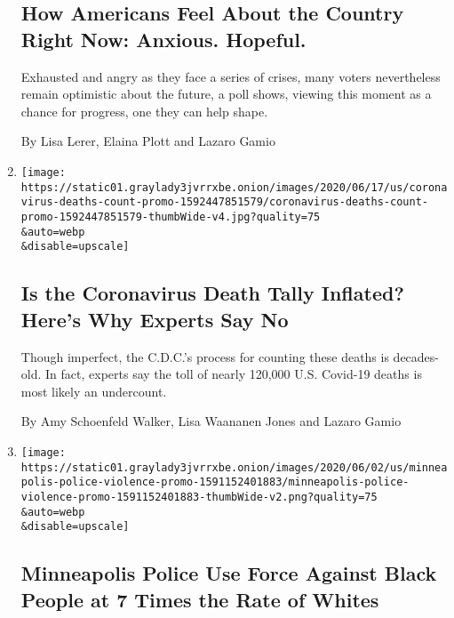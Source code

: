 \begin{enumerate}
{  \subsection{How Americans Feel About the Country Right Now: Anxious.
  Hopeful.}\label{how-americans-feel-about-the-country-right-now-anxious-hopeful}}

  Exhausted and angry as they face a series of crises, many voters
  nevertheless remain optimistic about the future, a poll shows, viewing
  this moment as a chance for progress, one they can help shape.

  By Lisa Lerer, Elaina Plott and Lazaro Gamio
\item
  \href{/interactive/2020/06/19/us/us-coronavirus-covid-death-toll.html}{}

  \texttt{[image: https://static01.graylady3jvrrxbe.onion/images/2020/06/17/us/coronavirus-deaths-count-promo-1592447851579/coronavirus-deaths-count-promo-1592447851579-thumbWide-v4.jpg?quality=75\\\&auto=webp\\\&disable=upscale]}

  \hypertarget{is-the-coronavirus-death-tally-inflated-heres-why-experts-say-no}{%
  \subsection{Is the Coronavirus Death Tally Inflated? Here's Why
  Experts Say
  No}\label{is-the-coronavirus-death-tally-inflated-heres-why-experts-say-no}}

  Though imperfect, the C.D.C.'s process for counting these deaths is
  decades-old. In fact, experts say the toll of nearly 120,000 U.S.
  Covid-19 deaths is most likely an undercount.

  By Amy Schoenfeld Walker, Lisa Waananen Jones and Lazaro Gamio
\item
  \href{/interactive/2020/06/03/us/minneapolis-police-use-of-force.html}{}

  \texttt{[image: https://static01.graylady3jvrrxbe.onion/images/2020/06/02/us/minneapolis-police-violence-promo-1591152401883/minneapolis-police-violence-promo-1591152401883-thumbWide-v2.png?quality=75\\\&auto=webp\\\&disable=upscale]}

  \hypertarget{minneapolis-police-use-force-against-black-people-at-7-times-the-rate-of-whites}{%
  \subsection{Minneapolis Police Use Force Against Black People at 7
  Times the Rate of
  Whites}\label{minneapolis-police-use-force-against-black-people-at-7-times-the-rate-of-whites}}


\end{enumerate}
